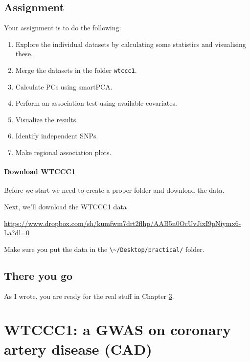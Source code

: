 \documentclass[
]{book}
\newcommand{\passthrough}[1]{#1}
\providecommand{\tightlist}{%
  \setlength{\itemsep}{0pt}\setlength{\parskip}{0pt}}
\begin{document}
\hypertarget{assignment}{%
\section{Assignment}\label{assignment}}

Your assignment is to do the following:

\begin{enumerate}
\def\labelenumi{\arabic{enumi}.}
\tightlist
\item
  Explore the individual datasets by calculating some statistics and visualising these.
\item
  Merge the datasets in the folder \passthrough{\lstinline!wtccc1!}.
\item
  Calculate PCs using smartPCA.
\item
  Perform an association test using available covariates.
\item
  Visualize the results.
\item
  Identify independent SNPs.
\item
  Make regional association plots.
\end{enumerate}

\hypertarget{download-wtccc1}{%
\subsubsection{Download WTCCC1}\label{download-wtccc1}}

Before we start we need to create a proper folder and download the data.

Next, we'll download the WTCCC1 data

\url{https://www.dropbox.com/sh/kumfwm7drt2flhp/AAB5n0OcUvJixI9pNiymx6-La?dl=0}

Make sure you put the data in the \passthrough{\lstinline!\~/Desktop/practical/!} folder.

\hypertarget{there-you-go}{%
\section{There you go}\label{there-you-go}}

As I wrote, you are ready for the real stuff in Chapter \ref{wtccc1}.

\hypertarget{wtccc1}{%
\chapter{WTCCC1: a GWAS on coronary artery disease (CAD)}\label{wtccc1}}
\end{document}
